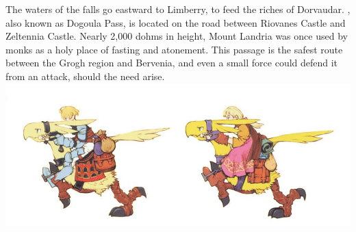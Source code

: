 The waters of the falls go eastward to Limberry, to feed the riches of Dorvaudar.
, also known as Dogoula Pass, is located on the road between Riovanes Castle and Zeltennia Castle. 
Nearly 2,000 dohms in height, Mount Landria was once used by monks as a holy place of fasting and atonement. 
This passage is the safest route between the Grogh region and Bervenia, and even a small force could defend it from an attack, should the need arise.
%
%
\clearpage
%
%
\onecolumn
%
\includegraphics[width=\textwidth]{./art/worldbook/chocobos.jpg}
%
\vfill
%
